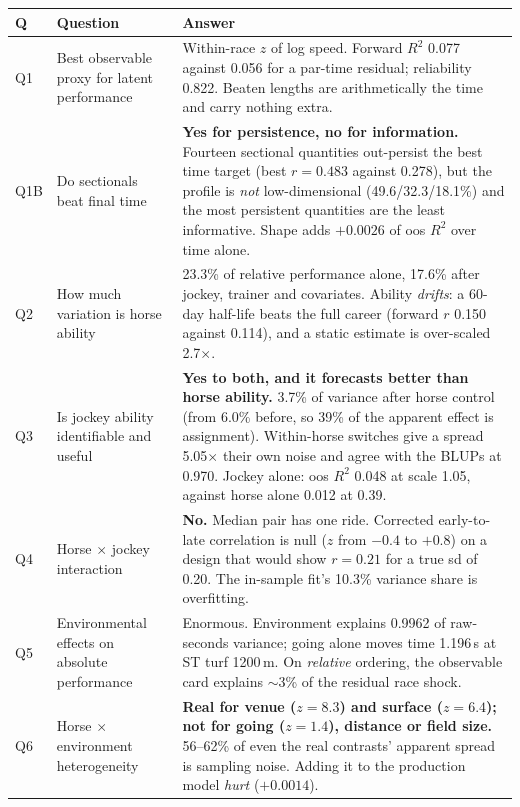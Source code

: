 \documentclass[11pt,a4paper]{article}
\begin{document}
\begin{longtable}{@{}p{}p{}p{}@{}}
\toprule
\textbf{Q} & \textbf{Question} & \textbf{Answer}\\
\midrule
\endhead
Q1 & Best observable proxy for latent performance & Within-race $z$ of log speed. Forward $R^2$ 0.077 against 0.056 for a par-time residual; reliability 0.822. Beaten lengths are arithmetically the time and carry nothing extra.\\[3pt]
Q1B & Do sectionals beat final time & \textbf{Yes for persistence, no for information.} Fourteen sectional quantities out-persist the best time target (best $r=0.483$ against 0.278), but the profile is \emph{not} low-dimensional (49.6/32.3/18.1\%) and the most persistent quantities are the least informative. Shape adds $+0.0026$ of oos $R^2$ over time alone.\\[3pt]
Q2 & How much variation is horse ability & 23.3\% of relative performance alone, 17.6\% after jockey, trainer and covariates. Ability \emph{drifts}: a 60-day half-life beats the full career (forward $r$ 0.150 against 0.114), and a static estimate is over-scaled 2.7$\times$.\\[3pt]
Q3 & Is jockey ability identifiable and useful & \textbf{Yes to both, and it forecasts better than horse ability.} 3.7\% of variance after horse control (from 6.0\% before, so 39\% of the apparent effect is assignment). Within-horse switches give a spread 5.05$\times$ their own noise and agree with the BLUPs at 0.970. Jockey alone: oos $R^2$ 0.048 at scale 1.05, against horse alone 0.012 at 0.39.\\[3pt]
Q4 & Horse $\times$ jockey interaction & \textbf{No.} Median pair has one ride. Corrected early-to-late correlation is null ($z$ from $-0.4$ to $+0.8$) on a design that would show $r=0.21$ for a true sd of 0.20. The in-sample fit's 10.3\% variance share is overfitting.\\[3pt]
Q5 & Environmental effects on absolute performance & Enormous. Environment explains 0.9962 of raw-seconds variance; going alone moves time 1.196\,s at ST turf 1200\,m. On \emph{relative} ordering, the observable card explains $\sim$3\% of the residual race shock.\\[3pt]
Q6 & Horse $\times$ environment heterogeneity & \textbf{Real for venue ($z=8.3$) and surface ($z=6.4$); not for going ($z=1.4$), distance or field size.} 56--62\% of even the real contrasts' apparent spread is sampling noise. Adding it to the production model \emph{hurt} ($+0.0014$).\\[3pt]

\end{longtable}
\end{document}
